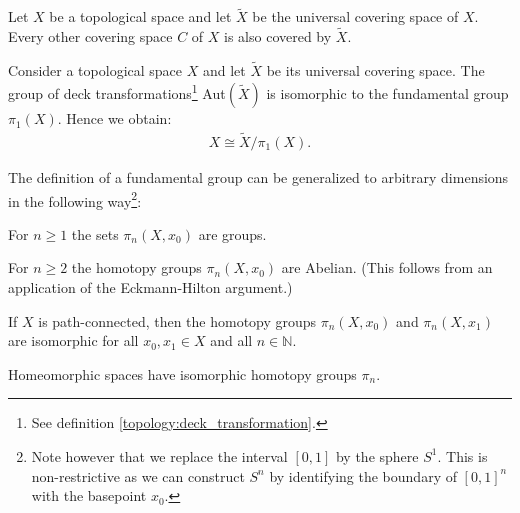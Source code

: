 
	\begin{uproperty}
		Let $X$ be a topological space and let $\widetilde{X}$ be the universal covering space of $X$. Every other covering space $C$ of $X$ is also covered by $\widetilde{X}$.
	\end{uproperty}
	\begin{property}
		Consider a topological space $X$ and let $\widetilde{X}$ be its universal covering space. The group of deck transformations\footnote{See definition \ref{topology:deck_transformation}.} Aut$(\widetilde{X})$ is isomorphic to the fundamental group $\pi_1(X)$. Hence we obtain:
		\begin{gather}
			X\cong \widetilde{X}/\pi_1(X).
		\end{gather}
	\end{property}

	The definition of a fundamental group can be generalized to arbitrary dimensions in the following way\footnote{Note however that we replace the interval $[0, 1]$ by the sphere $S^1$. This is non-restrictive as we can construct $S^n$ by identifying the boundary of $[0,1]^n$ with the basepoint $x_0$.}:

	\begin{property}
		For $n\geq1$ the sets $\pi_n(X, x_0)$ are groups.
	\end{property}
	\begin{property}\label{topology:abelian_homotopy_groups}
		For $n\geq2$  the homotopy groups $\pi_n(X, x_0)$ are Abelian. (This follows from an application of the Eckmann-Hilton argument.)
	\end{property}

	\begin{property}
		If $X$ is path-connected, then the homotopy groups $\pi_n(X, x_0)$ and $\pi_n(X, x_1)$ are isomorphic for all $x_0, x_1\in X$ and all $n\in\mathbb{N}$.
	\end{property}
	\begin{property}
		Homeomorphic spaces have isomorphic homotopy groups $\pi_n$.
	\end{property}


